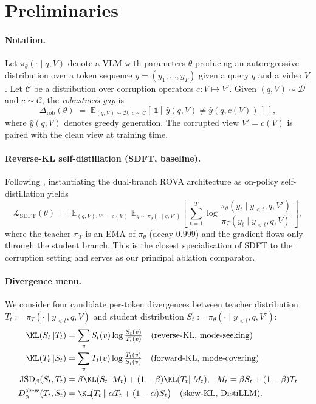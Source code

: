 \documentclass{article}
\newcommand{\JSD}{\mathrm{JSD}}
\newcommand{\teacher}{\pi_T}
\newcommand{\student}{\pi_\theta}
\begin{document}
\section{Preliminaries}
\label{sec:prelim}

\paragraph{Notation.}
Let $\pi_\theta(\cdot \mid q, V)$ denote a VLM with parameters $\theta$ producing an autoregressive distribution over a token sequence $y = (y_1, \dots, y_T)$ given a query $q$ and a video $V$. Let $\mathcal{C}$ be a distribution over corruption operators $c : V \mapsto V'$. Given $(q, V) \sim \mathcal{D}$ and $c \sim \mathcal{C}$, the \emph{robustness gap} is
\[
\Delta_{\text{rob}}(\theta) \;=\; \mathbb{E}_{(q,V) \sim \mathcal{D},\, c \sim \mathcal{C}}\!\left[\, \mathbb{1}[\,\hat{y}(q,V) \ne \hat{y}(q, c(V))\,] \,\right],
\]
where $\hat{y}(q, V)$ denotes greedy generation. The corrupted view $V' = c(V)$ is paired with the clean view at training time.

\paragraph{Reverse-KL self-distillation (SDFT, baseline).}
Following \citet{shenfeld2026sdft}, instantiating the dual-branch ROVA architecture as on-policy self-distillation yields
\begin{equation}
\label{eq:sdft}
\mathcal{L}_{\text{SDFT}}(\theta) \;=\; \mathbb{E}_{(q,V), V' = c(V)}\;\mathbb{E}_{y \sim \student(\cdot \mid q, V')} \!\left[\, \sum_{t=1}^T \log\frac{\student(y_t \mid y_{<t}, q, V')}{\teacher(y_t \mid y_{<t}, q, V)} \,\right],
\end{equation}
where the teacher $\teacher$ is an EMA of $\student$ (decay $0.999$) and the gradient flows only through the student branch. This is the closest specialisation of SDFT to the corruption setting and serves as our principal ablation comparator.

\paragraph{Divergence menu.}
We consider four candidate per-token divergences between teacher distribution $T_t := \teacher(\cdot \mid y_{<t}, q, V)$ and student distribution $S_t := \student(\cdot \mid y_{<t}, q, V')$:
\begin{align*}
\KL(S_t \| T_t) &= \sum_v S_t(v) \log \tfrac{S_t(v)}{T_t(v)} \quad \text{(reverse-KL, mode-seeking)}\\
\KL(T_t \| S_t) &= \sum_v T_t(v) \log \tfrac{T_t(v)}{S_t(v)} \quad \text{(forward-KL, mode-covering)}\\
\JSD_{\beta}(S_t, T_t) &= \beta \KL(S_t \| M_t) + (1-\beta) \KL(T_t \| M_t),\ \ M_t = \beta S_t + (1-\beta) T_t \\
D^{\text{skew}}_{\alpha}(T_t, S_t) &= \KL\!\big(T_t \,\|\, \alpha T_t + (1-\alpha) S_t\big) \quad \text{(skew-KL, DistiLLM)}.
\end{align*}
\end{document}
